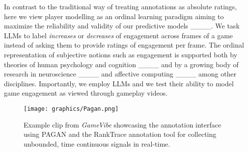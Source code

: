 In contrast to the traditional way of treating annotations as absolute ratings, here we view player modelling as an ordinal learning paradigm aiming to maximize the reliability and validity of our predictive models ____. We task LLMs to label \emph{increases} or \emph{decreases} of engagement across frames of a game instead of asking them to provide ratings of engagement per frame. The ordinal representation of subjective notions such as engagement is supported both by theories of human psychology and cognition ____ and by a growing body of research in neuroscience ____ and affective computing ____ among other disciplines. Importantly, we employ LLMs and we test their ability to model game engagement as viewed through gameplay videos. 


\begin{figure}[t]
\centering
\texttt{[image: graphics/Pagan.png]}
\label{fig:pagan}
\caption{Example clip from \emph{GameVibe} showcasing the annotation interface using PAGAN and the RankTrace annotation tool for collecting unbounded, time continuous signals in real-time.}
\end{figure}